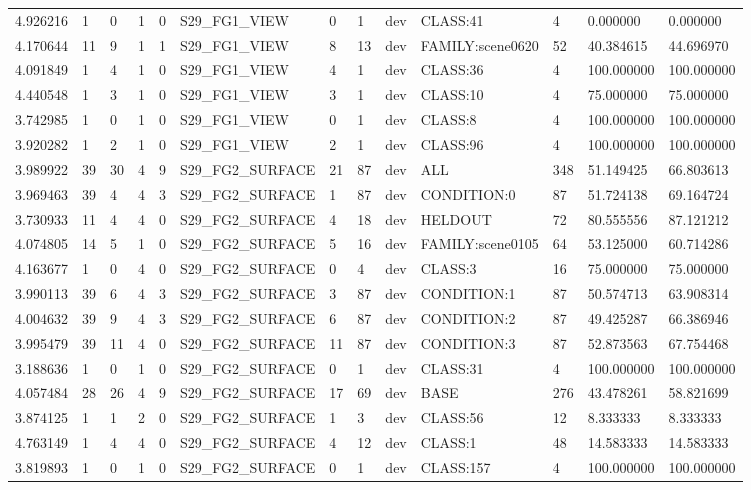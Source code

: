 \begin{tabular}{lllllllllllll}
4.926216 & 1 & 0 & 1 & 0 & S29\_FG1\_VIEW & 0 & 1 & dev & CLASS:41 & 4 & 0.000000 & 0.000000 \\
4.170644 & 11 & 9 & 1 & 1 & S29\_FG1\_VIEW & 8 & 13 & dev & FAMILY:scene0620 & 52 & 40.384615 & 44.696970 \\
4.091849 & 1 & 4 & 1 & 0 & S29\_FG1\_VIEW & 4 & 1 & dev & CLASS:36 & 4 & 100.000000 & 100.000000 \\
4.440548 & 1 & 3 & 1 & 0 & S29\_FG1\_VIEW & 3 & 1 & dev & CLASS:10 & 4 & 75.000000 & 75.000000 \\
3.742985 & 1 & 0 & 1 & 0 & S29\_FG1\_VIEW & 0 & 1 & dev & CLASS:8 & 4 & 100.000000 & 100.000000 \\
3.920282 & 1 & 2 & 1 & 0 & S29\_FG1\_VIEW & 2 & 1 & dev & CLASS:96 & 4 & 100.000000 & 100.000000 \\
3.989922 & 39 & 30 & 4 & 9 & S29\_FG2\_SURFACE & 21 & 87 & dev & ALL & 348 & 51.149425 & 66.803613 \\
3.969463 & 39 & 4 & 4 & 3 & S29\_FG2\_SURFACE & 1 & 87 & dev & CONDITION:0 & 87 & 51.724138 & 69.164724 \\
3.730933 & 11 & 4 & 4 & 0 & S29\_FG2\_SURFACE & 4 & 18 & dev & HELDOUT & 72 & 80.555556 & 87.121212 \\
4.074805 & 14 & 5 & 1 & 0 & S29\_FG2\_SURFACE & 5 & 16 & dev & FAMILY:scene0105 & 64 & 53.125000 & 60.714286 \\
4.163677 & 1 & 0 & 4 & 0 & S29\_FG2\_SURFACE & 0 & 4 & dev & CLASS:3 & 16 & 75.000000 & 75.000000 \\
3.990113 & 39 & 6 & 4 & 3 & S29\_FG2\_SURFACE & 3 & 87 & dev & CONDITION:1 & 87 & 50.574713 & 63.908314 \\
4.004632 & 39 & 9 & 4 & 3 & S29\_FG2\_SURFACE & 6 & 87 & dev & CONDITION:2 & 87 & 49.425287 & 66.386946 \\
3.995479 & 39 & 11 & 4 & 0 & S29\_FG2\_SURFACE & 11 & 87 & dev & CONDITION:3 & 87 & 52.873563 & 67.754468 \\
3.188636 & 1 & 0 & 1 & 0 & S29\_FG2\_SURFACE & 0 & 1 & dev & CLASS:31 & 4 & 100.000000 & 100.000000 \\
4.057484 & 28 & 26 & 4 & 9 & S29\_FG2\_SURFACE & 17 & 69 & dev & BASE & 276 & 43.478261 & 58.821699 \\
3.874125 & 1 & 1 & 2 & 0 & S29\_FG2\_SURFACE & 1 & 3 & dev & CLASS:56 & 12 & 8.333333 & 8.333333 \\
4.763149 & 1 & 4 & 4 & 0 & S29\_FG2\_SURFACE & 4 & 12 & dev & CLASS:1 & 48 & 14.583333 & 14.583333 \\
3.819893 & 1 & 0 & 1 & 0 & S29\_FG2\_SURFACE & 0 & 1 & dev & CLASS:157 & 4 & 100.000000 & 100.000000 \\

\end{tabular}
